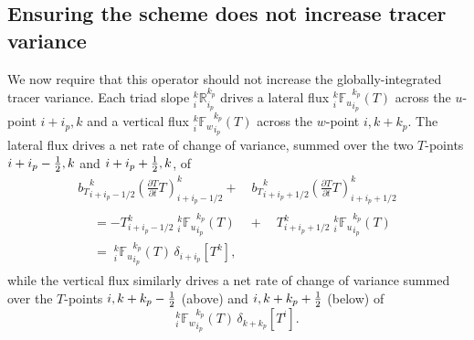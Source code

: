 \documentclass[../main/NEMO_manual]{subfiles}
\begin{document}
\subsection{Ensuring the scheme does not increase tracer variance}
\label{subsec:variance}

We now require that this operator should not increase the globally-integrated tracer variance.
Each triad slope $_i^k\mathbb{R}_{i_p}^{k_p}$ drives a lateral flux $_i^k{\mathbb{F}_u}_{i_p}^{k_p} (T)$ across
the $u$-point $i+i_p,k$ and a vertical flux $_i^k{\mathbb{F}_w}_{i_p}^{k_p} (T)$ across the $w$-point $i,k+k_p$.
The lateral flux drives a net rate of change of variance,
summed over the two $T$-points $i+i_p-\textstyle \frac{1}{2},k$ and $i+i_p+\textstyle \frac{1}{2},k$, of
\begin{multline}
  {b_T}_{i+i_p-1/2}^k\left(\frac{\partial T}{\partial t}T\right)_{i+i_p-1/2}^k+
  \quad {b_T}_{i+i_p+1/2}^k\left(\frac{\partial T}{\partial
      t}T\right)_{i+i_p+1/2}^k \\
  \begin{aligned}
    &= -T_{i+i_p-1/2}^k{\;} _i^k{\mathbb{F}_u}_{i_p}^{k_p} (T) \quad + \quad  T_{i+i_p+1/2}^k
    {\;}_i^k{\mathbb{F}_u}_{i_p}^{k_p} (T) \\
    &={\;} _i^k{\mathbb{F}_u}_{i_p}^{k_p} (T)\,\delta_{i+ i_p}[T^k], \label{eq:dvar_iso_i}
  \end{aligned}
\end{multline}
while the vertical flux similarly drives a net rate of change of variance summed over
the $T$-points $i,k+k_p-\textstyle \frac{1}{2}$ (above) and $i,k+k_p+\textstyle \frac{1}{2}$ (below) of
\begin{equation}
  \label{eq:dvar_iso_k}
  _i^k{\mathbb{F}_w}_{i_p}^{k_p} (T) \,\delta_{k+ k_p}[T^i].
\end{equation}
\end{document}
